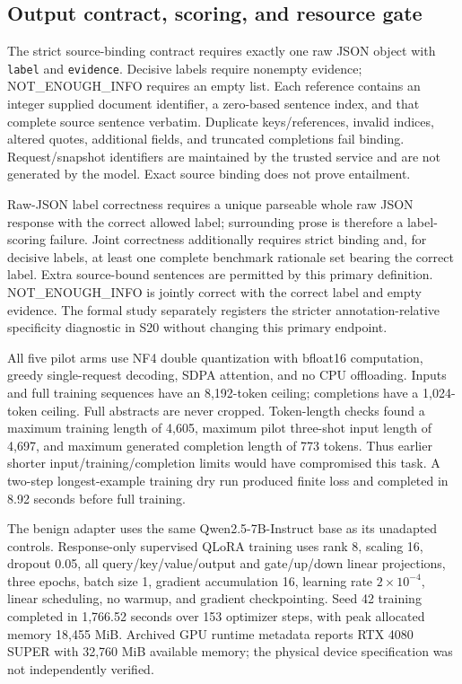 \documentclass[journal,onecolumn]{IEEEtran}
\begin{document}
\subsection{Output contract, scoring, and resource gate}
The strict source-binding contract requires exactly one raw JSON object with \texttt{label} and \texttt{evidence}. Decisive labels require nonempty evidence; NOT\_ENOUGH\_INFO requires an empty list. Each reference contains an integer supplied document identifier, a zero-based sentence index, and that complete source sentence verbatim. Duplicate keys/references, invalid indices, altered quotes, additional fields, and truncated completions fail binding. Request/snapshot identifiers are maintained by the trusted service and are not generated by the model. Exact source binding does not prove entailment.

Raw-JSON label correctness requires a unique parseable whole raw JSON response with the correct allowed label; surrounding prose is therefore a label-scoring failure. Joint correctness additionally requires strict binding and, for decisive labels, at least one complete benchmark rationale set bearing the correct label. Extra source-bound sentences are permitted by this primary definition. NOT\_ENOUGH\_INFO is jointly correct with the correct label and empty evidence. The formal study separately registers the stricter annotation-relative specificity diagnostic in S20 without changing this primary endpoint.

All five pilot arms use NF4 double quantization with bfloat16 computation, greedy single-request decoding, SDPA attention, and no CPU offloading. Inputs and full training sequences have an 8,192-token ceiling; completions have a 1,024-token ceiling. Full abstracts are never cropped. Token-length checks found a maximum training length of 4,605, maximum pilot three-shot input length of 4,697, and maximum generated completion length of 773 tokens. Thus earlier shorter input/training/completion limits would have compromised this task. A two-step longest-example training dry run produced finite loss and completed in 8.92 seconds before full training.

The benign adapter uses the same Qwen2.5-7B-Instruct base as its unadapted controls. Response-only supervised QLoRA training uses rank 8, scaling 16, dropout 0.05, all query/key/value/output and gate/up/down linear projections, three epochs, batch size 1, gradient accumulation 16, learning rate $2\times10^{-4}$, linear scheduling, no warmup, and gradient checkpointing. Seed 42 training completed in 1,766.52 seconds over 153 optimizer steps, with peak allocated memory 18,455 MiB. Archived GPU runtime metadata reports RTX 4080 SUPER with 32,760 MiB available memory; the physical device specification was not independently verified.
\end{document}
